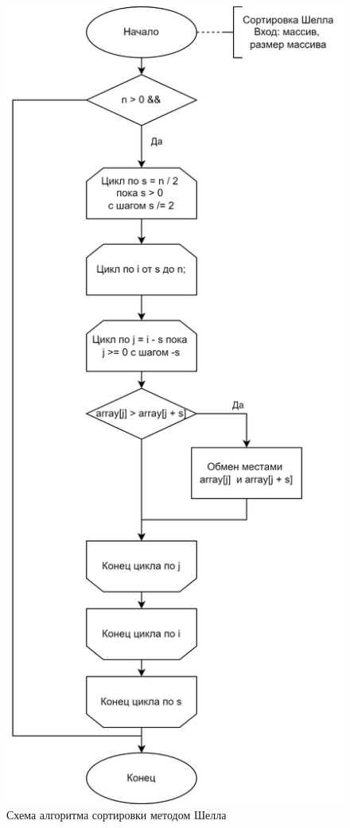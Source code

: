 \begin{figure}[h]
	\centering
	\includegraphics[height=0.8\textheight]{img/shell.png}
	\caption{Схема алгоритма сортировки методом Шелла}
	\label{fig:Shell}
\end{figure}

